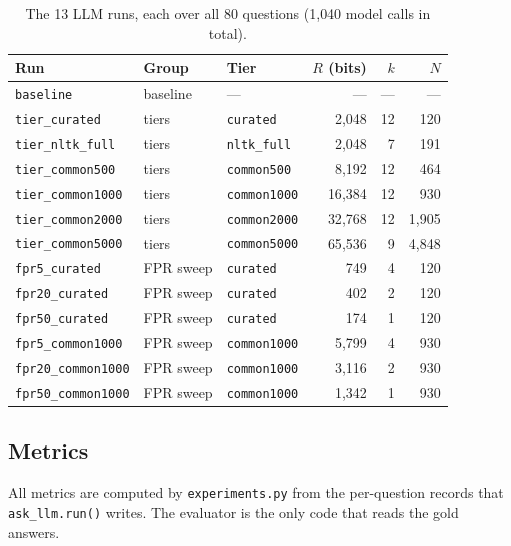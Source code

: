 \documentclass[11pt]{article}
\newcommand{\code}[1]{\texttt{#1}}
\begin{document}
\begin{table}[h]
\centering
\small
\begin{tabular}{@{}lllrrr@{}}
\toprule
Run & Group & Tier & $R$ (bits) & $k$ & $N$ \\
\midrule
\code{baseline} & baseline & --- & --- & --- & --- \\
\code{tier\_curated}    & tiers & \code{curated}    & 2{,}048  & 12 & 120 \\
\code{tier\_nltk\_full} & tiers & \code{nltk\_full} & 2{,}048  & 7  & 191 \\
\code{tier\_common500}  & tiers & \code{common500}  & 8{,}192  & 12 & 464 \\
\code{tier\_common1000} & tiers & \code{common1000} & 16{,}384 & 12 & 930 \\
\code{tier\_common2000} & tiers & \code{common2000} & 32{,}768 & 12 & 1{,}905 \\
\code{tier\_common5000} & tiers & \code{common5000} & 65{,}536 & 9  & 4{,}848 \\
\code{fpr5\_curated}    & FPR sweep & \code{curated} & 749 & 4 & 120 \\
\code{fpr20\_curated}   & FPR sweep & \code{curated} & 402 & 2 & 120 \\
\code{fpr50\_curated}   & FPR sweep & \code{curated} & 174 & 1 & 120 \\
\code{fpr5\_common1000}  & FPR sweep & \code{common1000} & 5{,}799 & 4 & 930 \\
\code{fpr20\_common1000} & FPR sweep & \code{common1000} & 3{,}116 & 2 & 930 \\
\code{fpr50\_common1000} & FPR sweep & \code{common1000} & 1{,}342 & 1 & 930 \\
\bottomrule
\end{tabular}
\caption{The 13 LLM runs, each over all 80 questions (1{,}040 model calls in total).}
\label{tab:runs}
\end{table}

\subsection{Metrics}
All metrics are computed by \code{experiments.py} from the per-question records that
\code{ask\_llm.run()} writes. The evaluator is the only code that reads the gold answers.
\end{document}
